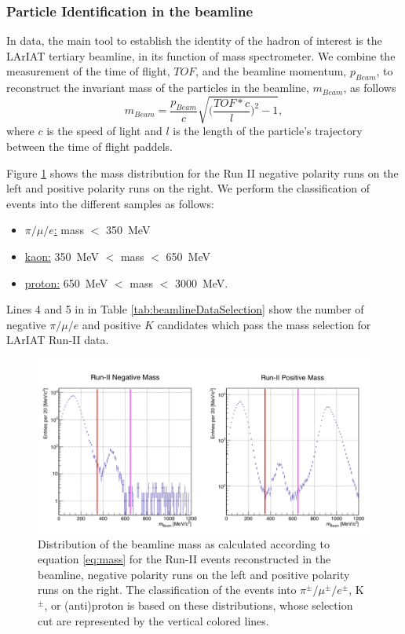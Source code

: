 \subsubsection{Particle Identification in the beamline}
In data, the main tool to establish the identity of the hadron of interest is the LArIAT tertiary beamline, in its function of mass spectrometer. We combine the measurement of the time of flight, $TOF$, and the beamline momentum, $p_{Beam}$, to reconstruct the invariant mass of the particles in the beamline, $m_{Beam}$, as follows
\begin{equation}
m_{Beam} = \frac{p_{Beam}}{c}\sqrt{\biggl(\frac{TOF*c}{l}\biggr)^2 -1},
\label{eq:mass}
\end{equation}
 where $c$ is the speed of light and $l$ is the length of the particle's trajectory between the time of flight paddels. 

Figure \ref{fig:mass} shows the mass distribution for the Run II negative polarity runs on the left and positive polarity runs on the right. We perform the classification of events into the different samples as follows:

\begin{itemize}
\item \underline{$\pi/\mu/e$:}  mass $<$ 350~MeV

\item \underline{kaon:} 350~MeV $<$ mass $<$ 650~MeV

\item \underline{proton:} 650~MeV $<$ mass $<$ 3000~MeV.

\end{itemize}

Lines 4 and 5 in in Table \ref{tab:beamlineDataSelection} show the number of negative $\pi/\mu/e$ and positive $K$ candidates which pass the mass selection for LArIAT Run-II data.

\begin{figure}
  \centering  
\includegraphics[width=\textwidth]{Chapter-4/Images/massRunII.png}
\caption{Distribution of the beamline mass as calculated according to equation \ref{eq:mass} for the Run-II events reconstructed in the beamline, negative polarity runs on the left and positive polarity runs on the right. The classification of the events into $\pi^\pm/ \mu^\pm/e^\pm$, K$^\pm$, or (anti)proton is based on these distributions, whose selection cut are represented by the vertical colored lines.}
\label{fig:mass}
\end{figure}

